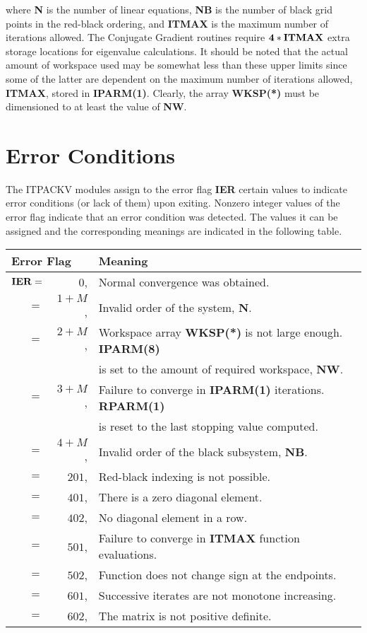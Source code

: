 \noindent
where {\bf N} is the number of linear equations, {\bf NB} is the number
of black grid points in the red-black ordering, and {\bf ITMAX} is the
maximum number of iterations allowed.  The Conjugate Gradient routines 
require ${\bf 4*ITMAX}$ extra storage locations for eigenvalue 
calculations.  It should be noted that the actual amount of workspace 
used may be somewhat less than these upper limits since some of the 
latter are dependent on the maximum number of iterations allowed, 
{\bf ITMAX}, stored in {\bf IPARM(1)}.  Clearly, the array {\bf WKSP(*)} 
must be dimensioned to at least the value of {\bf NW}.
 
\section{Error Conditions}
\label{error}
 
The ITPACKV modules assign to the error flag {\bf IER} certain values
to indicate error conditions (or lack of them) upon exiting.
Nonzero integer values of the error flag indicate that an error
condition was detected.  The values it can be assigned and the 
corresponding meanings are indicated in the following table.
 
\bigskip
\begin{tabular}{rrl} \hline
  \multicolumn{2}{l}{Error Flag} & Meaning \\ \hline
   ${\bf IER} =$ &  $0$, & Normal convergence was obtained. \\
   $ =$ & $1+M$, & Invalid order of the system, {\bf N}. \\
   $ =$ & $2+M$, & Workspace array {\bf WKSP(*)} is not large 
                            enough. {\bf IPARM(8)} \\
        &        & is set to the amount of required workspace, 
                            {\bf NW}. \\
   $ =$ & $3+M$, & Failure to converge in {\bf IPARM(1)} 
                           iterations. {\bf RPARM(1)} \\
        &        & is reset to the last stopping value computed. \\
   $ =$ & $4+M$, & Invalid order of the black subsystem, {\bf NB}. \\
   $ =$ & $201$, & Red-black indexing is not possible. \\
   $ =$ & $401$, & There is a zero diagonal element. \\
   $ =$ & $402$, & No diagonal element in a row. \\
   $ =$ & $501$, & Failure to converge in {\bf ITMAX} 
                              function evaluations. \\
   $ =$ & $502$, & Function does not change sign at the endpoints. \\
   $ =$ & $601$, & Successive iterates are not monotone increasing. \\
   $ =$ & $602$, & The matrix is not positive definite. \\
                   \hline
\end{tabular}
\bigskip

